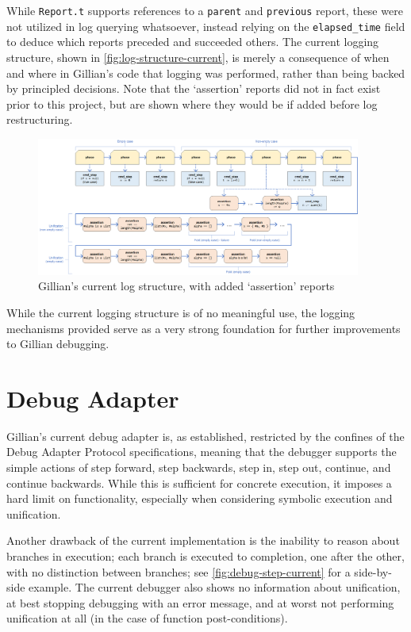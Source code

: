 While \texttt{Report.t} supports references to a \texttt{parent} and
\texttt{previous} report, these were not utilized in log querying whatsoever,
instead relying on the \texttt{elapsed\_time} field to deduce which reports
preceded and succeeded others. The current logging structure, shown in
\autoref{fig:log-structure-current}, is merely a consequence of when and where
in Gillian's code that logging was performed, rather than being backed by
principled decisions. Note that the `assertion' reports did not in fact exist
prior to this project, but are shown where they would be if added before log
restructuring.

\begin{figure}
  \center{}
  \includegraphics[width=0.95\textwidth]{img/log-structure-current.png}
  \caption{Gillian's current log structure, with added `assertion' reports}%
  \label{fig:log-structure-current}
\end{figure}

While the current logging structure is of no meaningful use, the logging
mechanisms provided serve as a very strong foundation for further improvements
to Gillian debugging.


\section{Debug Adapter}\label{sec:current:dap}

Gillian's current debug adapter is, as established, restricted by the confines
of the Debug Adapter Protocol specifications, meaning that the debugger supports
the simple actions of step forward, step backwards, step in, step out, continue,
and continue backwards. While this is sufficient for concrete execution, it
imposes a hard limit on functionality, especially when considering symbolic
execution and unification.

Another drawback of the current implementation is the inability to reason
about branches in execution; each branch is executed to completion, one after
the other, with no distinction between branches; see
\autoref{fig:debug-step-current} for a side-by-side example. The current
debugger also shows no information about unification, at best stopping debugging
with an error message, and at worst not performing unification at all (in the
case of function post-conditions).

